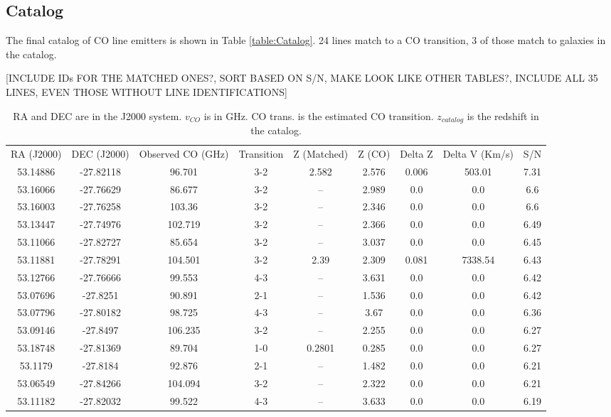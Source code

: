 \subsection{Catalog}

The final catalog of CO line emitters is shown in Table \ref{table:Catalog}. 24 lines match to a CO transition, 3 of those match to galaxies in the catalog.

[INCLUDE IDs FOR THE MATCHED ONES?, SORT BASED ON S/N, MAKE LOOK LIKE OTHER TABLES?, INCLUDE ALL 35 LINES, EVEN THOSE WITHOUT LINE IDENTIFICATIONS]

\begin{table}
\centering
\caption{RA and DEC are in the J2000 system. $v_{CO}$ is in GHz. CO trans. is the estimated CO transition. $z_{catalog}$ is the redshift in the catalog. }
\begin{tabular}{ccccccccc}
RA (J2000) & DEC (J2000) & Observed CO (GHz) & Transition & Z (Matched) & Z (CO) & Delta Z & Delta V (Km/s) & S/N \\
53.14886 & -27.82118 & 96.701 & 3-2 & 2.582 & 2.576 & 0.006 & 503.01 & 7.31 \\
53.16066 & -27.76629 & 86.677 & 3-2 & -- & 2.989 & 0.0 & 0.0 & 6.6 \\
53.16003 & -27.76258 & 103.36 & 3-2 & -- & 2.346 & 0.0 & 0.0 & 6.6 \\
53.13447 & -27.74976 & 102.719 & 3-2 & -- & 2.366 & 0.0 & 0.0 & 6.49 \\
53.11066 & -27.82727 & 85.654 & 3-2 & -- & 3.037 & 0.0 & 0.0 & 6.45 \\
53.11881 & -27.78291 & 104.501 & 3-2 & 2.39 & 2.309 & 0.081 & 7338.54 & 6.43 \\
53.12766 & -27.76666 & 99.553 & 4-3 & -- & 3.631 & 0.0 & 0.0 & 6.42 \\
53.07696 & -27.8251 & 90.891 & 2-1 & -- & 1.536 & 0.0 & 0.0 & 6.42 \\
53.07796 & -27.80182 & 98.725 & 4-3 & -- & 3.67 & 0.0 & 0.0 & 6.36 \\
53.09146 & -27.8497 & 106.235 & 3-2 & -- & 2.255 & 0.0 & 0.0 & 6.27 \\
53.18748 & -27.81369 & 89.704 & 1-0 & 0.2801 & 0.285 & 0.0 & 0.0 & 6.27 \\
53.1179 & -27.8184 & 92.876 & 2-1 & -- & 1.482 & 0.0 & 0.0 & 6.21 \\
53.06549 & -27.84266 & 104.094 & 3-2 & -- & 2.322 & 0.0 & 0.0 & 6.21 \\
53.11182 & -27.82032 & 99.522 & 4-3 & -- & 3.633 & 0.0 & 0.0 & 6.19 \\

\end{tabular}
\end{table}
